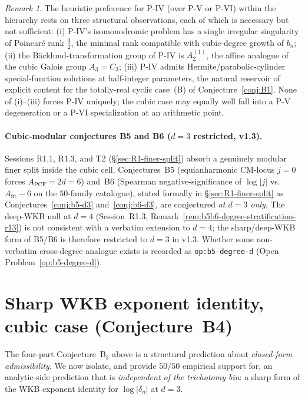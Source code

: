 \documentclass[11pt,a4paper]{article}
\theoremstyle{definition}
\theoremstyle{remark}
\newtheorem{remark}[conjecture]{Remark}
\begin{document}
\begin{remark}\label{rem:painleveIV}
The heuristic preference for P-IV (over P-V or P-VI) within the
hierarchy rests on three structural observations, each of which is
necessary but not sufficient: (i) P-IV's isomonodromic problem has a
single irregular singularity of Poincar\'e rank $\frac{3}{2}$, the
minimal rank compatible with cubic-degree growth of $b_{n}$;
(ii) the B\"acklund-transformation group of P-IV is $A_{2}^{(1)}$, the
affine analogue of the cubic Galois group $A_{3}=C_{3}$;
(iii) P-IV admits Hermite/parabolic-cylinder special-function solutions
at half-integer parameters, the natural reservoir of explicit content
for the totally-real cyclic case~(B) of Conjecture~\ref{conj:B1}. None
of (i)--(iii) forces P-IV uniquely; the cubic case may equally well
fall into a P-V degeneration or a P-VI specialization at an
arithmetic point.
\end{remark}

\paragraph{Cubic-modular conjectures B5 and B6 ($d=3$ restricted, v1.3).}
Sessions R1.1, R1.3, and T2 (\S\ref{sec:R1-finer-split}) absorb a
genuinely modular finer split inside the cubic cell. Conjectures~B5
(equianharmonic CM-locus $j=0$ forces $A_{\mathrm{PCF}}=2d=6$) and~B6
(Spearman negative-significance of $\log|j|$ vs.\ $A_{\mathrm{fit}}-6$
on the $50$-family catalogue), stated formally in
\S\ref{sec:R1-finer-split} as Conjectures~\ref{conj:b5-d3}
and~\ref{conj:b6-d3}, are conjectured \emph{at $d=3$ only}. The
deep-WKB null at $d=4$ (Session~R1.3,
Remark~\ref{rem:b5b6-degree-stratification-r13}) is not consistent
with a verbatim extension to $d=4$; the sharp/deep-WKB form of
B5/B6 is therefore restricted to $d=3$ in v1.3. Whether some
non-verbatim cross-degree analogue exists is recorded as
\texttt{op:b5-degree-d} (Open Problem~\ref{op:b5-degree-d}).

\section{Sharp WKB exponent identity, cubic case (Conjecture~B4)}\label{sec:B4}

The four-part Conjecture~B$_{3}$ above is a structural prediction
about \emph{closed-form admissibility}. We now isolate, and provide
$50/50$ empirical support for, an analytic-side prediction that is
\emph{independent of the trichotomy bin}: a sharp form of the WKB
exponent identity for $\log|\delta_{n}|$ at $d=3$.
\end{document}
